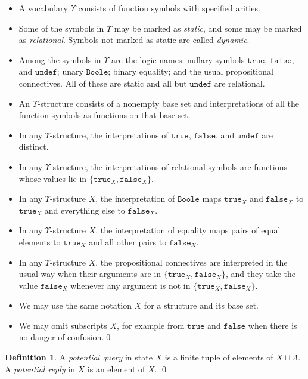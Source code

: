 \documentclass{LMCS}
\theoremstyle{definition}
\newtheorem{df}[thm]{Definition}
\newenvironment{ls}{\begin{itemize}}{\end{itemize}}
\newcommand{\ttt}[1]{\ensuremath{\mathtt {#1}}}
\begin{document}
\begin{conv}   \label{vocab}
\mbox{}
  \begin{ls}
    \item A vocabulary $\Upsilon$ consists of function symbols with
    specified arities.
    \item Some of the symbols in $\Upsilon$ may be marked as
    \emph{static}, and some may be marked as \emph{relational}.
    Symbols not marked as static are called \emph{dynamic}.
    \item Among the symbols in $\Upsilon$ are the logic names: nullary
    symbols \ttt{true}, \ttt{false}, and \ttt{undef}; unary
    \ttt{Boole}; binary equality; and the usual propositional
    connectives.  All of these are static and all but \ttt{undef} are
    relational.
  \item An $\Upsilon$-structure consists of a nonempty base set and
    interpretations of all the function symbols as functions on that
    base set.
  \item In any $\Upsilon$-structure, the interpretations of \ttt{true},
    \ttt{false}, and \ttt{undef} are distinct.
    \item In any $\Upsilon$-structure, the interpretations of relational
    symbols are functions whose values lie in 
    $\{\ttt{true}_X,\ttt{false}_X\}$.
  \item In any $\Upsilon$-structure $X$, the interpretation of
    \ttt{Boole} maps $\ttt{true}_X$ and $\ttt{false}_X$ to
    $\ttt{true}_X$ and everything else to $\ttt{false}_X$.
    \item In any $\Upsilon$-structure $X$, the interpretation of
    equality maps pairs of equal elements to $\ttt{true}_X$ and all
    other pairs to $\ttt{false}_X$.
    \item In any $\Upsilon$-structure $X$, the propositional connectives
    are interpreted in the usual way when their arguments are in
    $\{\ttt{true}_X,\ttt{false}_X\}$, and they take the value
    $\ttt{false}_X$ whenever any argument is not in
    $\{\ttt{true}_X,\ttt{false}_X\}$.
    \item We may use the same notation $X$ for a structure and its
    base set.
\item We may omit subscripts $X$, for example from \ttt{true} and
  \ttt{false} when there is no danger of confusion.\qed
  \end{ls}
\end{conv}



\begin{df}
A \emph{potential query} in state $X$ is a finite tuple of elements of
$X\sqcup\Lambda$.  A \emph{potential reply} in $X$ is an element of
$X$.
\qed\end{df}
\end{document}
